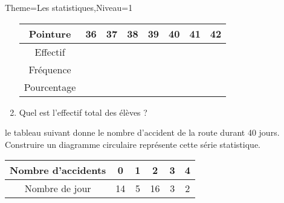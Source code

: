 \documentclass[a4paper,12pt]{article}
\begin{document}
\begin{Maquette}[Fiche]{Theme=Les statistiques,Niveau=1}
\begin{exercice}
\begin{minipage}{.55\linewidth}
\begin{enumerate}
\begin{tabular}{|c|c|c|c|c|c|c|c|}
\hline 
Pointure & 36 & 37 & 38 & 39 & 40 & 41 & 42 \\ 
\hline 
Effectif &  &  &  &  &  &  &  \\ 
\hline 
Fréquence &  &  &  &  &  &  &  \\ 
\hline 
Pourcentage &  &  &  &  &  &  &  \\ 
\hline 
\end{tabular} 
\item Quel est l'effectif total des élèves ?
\end{enumerate}
\end{minipage}%
\begin{minipage}{.45\linewidth}
\end{minipage}
\end{exercice}

\begin{exercice}
\begin{minipage}{0.55\linewidth}
le tableau suivant donne le nombre d'accident de la route durant 40 jours.
Construire un diagramme circulaire représente cette série statistique.
\end{minipage}%
\begin{minipage}{0.45\linewidth}
\begin{tabular}{|c|c|c|c|c|c|}
\hline 
Nombre d'accidents & 0 & 1 & 2 & 3 & 4 \\ 
\hline 
Nombre de jour & 14 & 5 & 16 & 3 & 2 \\ 
\hline 
\end{tabular} 
\end{minipage}
\end{exercice}




\end{Maquette}
\end{document}
